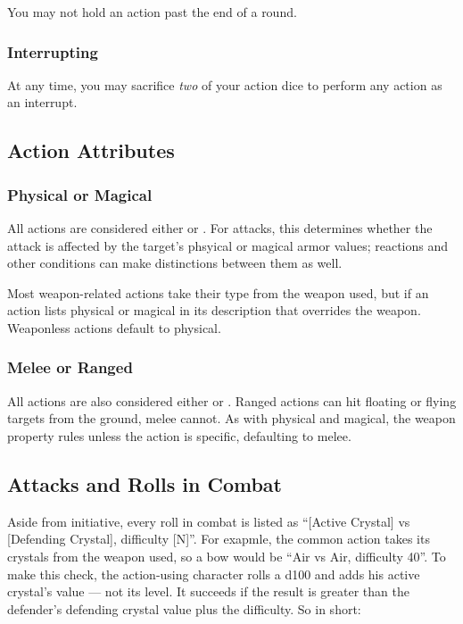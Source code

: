 \begin{multicols}{2}
            You may not hold an action past the end of a round. 
                
        \subsubsection{Interrupting}
            At any time, you may sacrifice \textit{two} of your action dice to perform any action as an interrupt. 

    \subsection{Action Attributes}
        \subsubsection{Physical or Magical}
            All actions are considered either  or . For attacks, this determines whether the attack is affected by the target's phsyical or magical armor values; reactions and other conditions can make distinctions between them as well.

            Most weapon-related actions take their type from the weapon used, but if an action lists physical or magical in its description that overrides the weapon. Weaponless actions default to physical.
        
        \subsubsection{Melee or Ranged}
            All actions are also considered either  or . Ranged actions can hit floating or flying targets from the ground, melee cannot. As with physical and magical, the weapon property rules unless the action is specific, defaulting to melee.


    \subsection{Attacks and Rolls in Combat}\label{subsec:attacks}
        Aside from initiative, every roll in combat is listed as ``[Active Crystal] vs [Defending Crystal], difficulty [N]''. For exapmle, the common action  takes its crystals from the weapon used, so a bow would be ``Air vs Air, difficulty 40''. To make this check, the action-using character rolls a d100 and adds his active crystal's value --- not its level. It succeeds if the result is greater than the defender's defending crystal value plus the difficulty. So in short:


\end{multicols}
